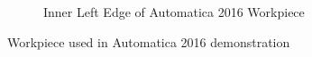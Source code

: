 \begin{figure}[!htbp]
\begin{subfigure}[b]{0.4\textwidth}
		\caption{Inner Left Edge of Automatica 2016 Workpiece}  
	\end{subfigure}	
\caption{Workpiece used in Automatica 2016 demonstration}
\label{fig:uc2}
\end{figure}

